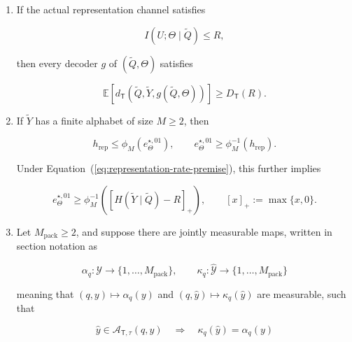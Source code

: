 \documentclass[10pt]{article} %
\renewcommand{\eqref}[1]{\textup{(\ref{#1})}}
\providecommand{\1}{\mathbf{1}}  %
\theoremstyle{remark}
\theoremstyle{definition}
\begin{document}
\begin{enumerate}[label=(\roman*),itemsep=3pt,topsep=3pt]

\item If the actual representation channel satisfies

\begin{equation}
I(U;\Theta\mid\widetilde Q)\leq R,
\label{eq:representation-rate-premise}
\end{equation}

then every decoder $g$ of $(\widetilde Q,\Theta)$ satisfies

\begin{equation}
\mathbb E\!\left[
d_{\mathsf T}\!\left(
\widetilde Q,
\widetilde Y,
g(\widetilde Q,\Theta)
\right)
\right]
\geq
D_{\mathsf T}(R).
\label{eq:representation-distortion-converse}
\end{equation}

\item If $\widetilde Y$ has a finite alphabet of size $M\geq2$, then

\begin{equation}
h_{\mathrm{rep}}
\leq
\phi_M\!\left(e_{\Theta}^{\star,01}\right),
\qquad
e_{\Theta}^{\star,01}
\geq
\phi_M^{-1}(h_{\mathrm{rep}}).
\label{eq:conditional-fano-converse}
\end{equation}

Under Equation~\eqref{eq:representation-rate-premise}, this further implies

\begin{equation}
e_{\Theta}^{\star,01}
\geq
\phi_M^{-1}\!\left(
\left[
H(\widetilde Y\mid\widetilde Q)-R
\right]_+
\right),
\qquad
[x]_+:=\max\{x,0\}.
\label{eq:rate-fano-converse}
\end{equation}

\item Let $M_{\mathrm{pack}}\geq2$, and suppose there are jointly measurable maps, written in section notation as

\begin{equation}
\alpha_q:\mathcal Y\to\{1,\ldots,M_{\mathrm{pack}}\},
\qquad
\kappa_q:\widehat{\mathcal Y}\to\{1,\ldots,M_{\mathrm{pack}}\}
\label{eq:representation-packing-maps}
\end{equation}

meaning that $(q,y)\mapsto\alpha_q(y)$ and $(q,\widehat y)\mapsto\kappa_q(\widehat y)$ are measurable, such that

\begin{equation}
\widehat y\in\mathcal A_{\mathsf T,\tau}(q,y)
\quad\Longrightarrow\quad
\kappa_q(\widehat y)=\alpha_q(y)
\label{eq:acceptance-separated-reduction}
\end{equation}


\end{enumerate}
\end{document}
